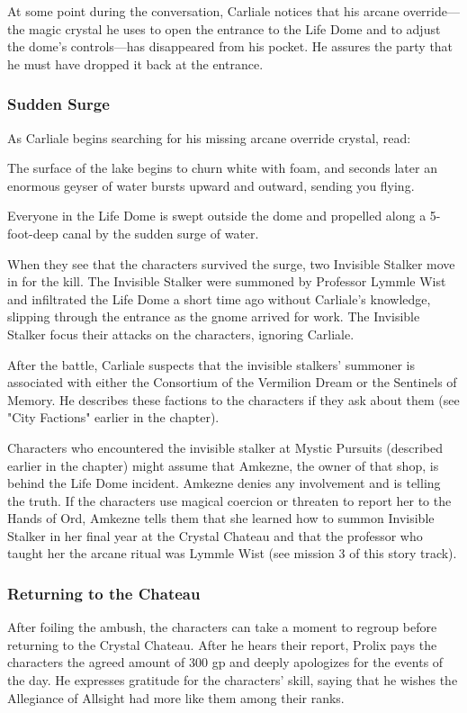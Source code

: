 \documentclass[10pt,a4paper,twoside,twocolumn,openany,nodeprecatedcode]{dndbook}
\begin{document}
At some point during the conversation, Carliale notices that his arcane override—the magic crystal he uses to open the entrance to the Life Dome and to adjust the dome's controls—has disappeared from his pocket. He assures the party that he must have dropped it back at the entrance.

\subsubsection{Sudden Surge}
As Carliale begins searching for his missing arcane override crystal, read:

\begin{DndReadAloud}{}
The surface of the lake begins to churn white with foam, and seconds later an enormous geyser of water bursts upward and outward, sending you flying.

\end{DndReadAloud}

Everyone in the Life Dome is swept outside the dome and propelled along a 5-foot-deep canal by the sudden surge of water.

When they see that the characters survived the surge, two Invisible Stalker move in for the kill. The Invisible Stalker were summoned by Professor Lymmle Wist and infiltrated the Life Dome a short time ago without Carliale's knowledge, slipping through the entrance as the gnome arrived for work. The Invisible Stalker focus their attacks on the characters, ignoring Carliale.

After the battle, Carliale suspects that the invisible stalkers' summoner is associated with either the Consortium of the Vermilion Dream or the Sentinels of Memory. He describes these factions to the characters if they ask about them (see "City Factions" earlier in the chapter).

Characters who encountered the invisible stalker at Mystic Pursuits (described earlier in the chapter) might assume that Amkezne, the owner of that shop, is behind the Life Dome incident. Amkezne denies any involvement and is telling the truth. If the characters use magical coercion or threaten to report her to the Hands of Ord, Amkezne tells them that she learned how to summon Invisible Stalker in her final year at the Crystal Chateau and that the professor who taught her the arcane ritual was Lymmle Wist (see mission 3 of this story track).

\subsubsection{Returning to the Chateau}
After foiling the ambush, the characters can take a moment to regroup before returning to the Crystal Chateau. After he hears their report, Prolix pays the characters the agreed amount of 300 gp and deeply apologizes for the events of the day. He expresses gratitude for the characters' skill, saying that he wishes the Allegiance of Allsight had more like them among their ranks.
\end{document}
